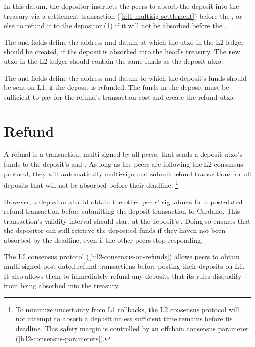 \documentclass[../hydrozoa.tex]{subfiles}
\begin{document}
In this datum, the depositor instructs the peers to absorb the deposit into the treasury via a settlement transaction (\cref{h:l1-multisig-settlement}) before the , or else to refund it to the depositor (\cref{h:l1-multisig-refund}) if it will not be absorbed before the .

The  and  fields define the address and datum at which the utxo in the L2 ledger should be created, if the deposit is absorbed into the head's treasury.
The new utxo in the L2 ledger should contain the same funds as the deposit utxo.

The  and  fields define the address and datum to which the deposit's funds should be sent on L1, if the deposit is refunded.
The funds in the deposit must be sufficient to pay for the refund's transaction cost and create the refund utxo.

\section{Refund}%
\label{h:l1-multisig-refund}%

A refund is a transaction, multi-signed by all peers, that sends a deposit utxo's funds to the deposit's  and .
As long as the peers are following the L2 consensus protocol, they will automatically multi-sign and submit refund transactions for all deposits that will not be absorbed before their deadline.%
\footnote{To minimize uncertainty from L1 rollbacks, the L2 consensus protocol will not attempt to absorb a deposit unless sufficient time remains before its deadline.
This safety margin is controlled by an offchain consensus parameter (\cref{h:l2-consensus-parameters}).}

However, a depositor should obtain the other peers' signatures for a post-dated refund transaction before submitting the deposit transaction to Cardano.
This transaction's validity interval should start at the deposit's .
Doing so ensures that the depositor can still retrieve the deposited funds if they haven not been absorbed by the deadline, even if the other peers stop responding.

The L2 consensus protocol (\cref{h:l2-consensus-on-refunds}) allows peers to obtain multi-signed post-dated refund transactions before posting their deposits on L1.
It also allows them to immediately refund any deposits that its rules disqualify from being absorbed into the treasury.
\end{document}
